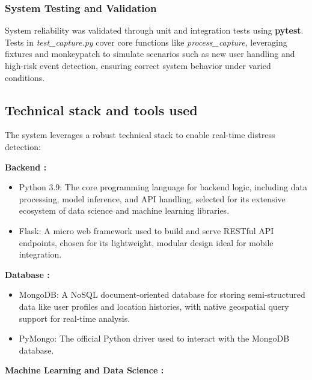 \documentclass[12pt,a4paper,oneside,english]{book}
\begin{document}
{\subsubsection{System Testing and Validation}
\label{subsec:system_testing}
System reliability was validated through unit and integration tests using \textbf{pytest}. Tests in \textit{test\_capture.py} cover core functions like \textit{process\_capture}, 
leveraging fixtures and monkeypatch to simulate scenarios such as new user handling and high-risk event detection, ensuring correct system behavior under varied conditions.


\subsection{Technical stack and tools used}
\label{technical}
The system leverages a robust technical stack to enable real-time distress detection:

\textbf{Backend :}
\begin{itemize}
    \item Python 3.9: The core programming language for backend logic, including data processing, model inference, and API handling, selected for its extensive ecosystem of data science and machine learning libraries.
    \item Flask: A micro web framework used to build and serve RESTful API endpoints, chosen for its lightweight, modular design ideal for mobile integration.
\end{itemize}

\textbf{Database :}
\begin{itemize}
\item MongoDB: A NoSQL document-oriented database for storing semi-structured data like user profiles and location histories, with native geospatial query support for real-time analysis.
\item PyMongo: The official Python driver used to interact with the MongoDB database.
\end{itemize}

\textbf{Machine Learning and Data Science :}

}
\end{document}
